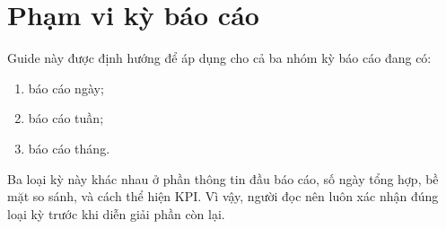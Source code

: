 \section{Phạm vi kỳ báo cáo}

Guide này được định hướng để áp dụng cho cả ba nhóm kỳ báo cáo đang có:

\begin{enumerate}[label=-]
\item báo cáo ngày;
\item báo cáo tuần;
\item báo cáo tháng.
\end{enumerate}

Ba loại kỳ này khác nhau ở phần thông tin đầu báo cáo, số ngày tổng hợp, bề mặt so sánh, và cách thể hiện KPI. Vì vậy, người đọc nên luôn xác nhận đúng loại kỳ trước khi diễn giải phần còn lại.
